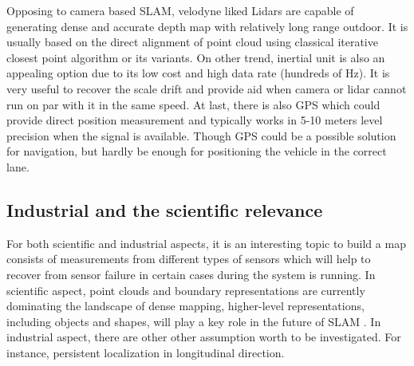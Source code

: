 Opposing to camera based \gls{SLAM}, velodyne liked Lidars are capable
of generating dense and accurate depth map with relatively long range
outdoor. It is usually based on the direct alignment of point cloud
using classical iterative closest point algorithm or its variants. On
other trend, inertial unit is also an appealing option due to its low
cost and high data rate (hundreds of Hz). It is very useful to recover
the scale drift and provide aid when camera or lidar cannot run on par
with it in the same speed. At last, there is also GPS which could
provide direct position measurement and typically works in 5-10 meters
level precision when the signal is available. Though GPS could be a
possible solution for navigation, but hardly be enough for positioning
the vehicle in the correct lane.


\subsection{Industrial and the scientific relevance}

For both scientific and industrial aspects, it is an interesting topic
to build a map consists of measurements from different types of
sensors which will help to recover from sensor failure in certain
cases during the system is running. In scientific aspect, point clouds
and boundary representations are currently dominating the landscape of
dense mapping, higher-level representations, including objects and
shapes, will play a key role in the future of \gls{SLAM} \cite{DBLP:journals/corr/CadenaCCLSN0L16}. In
industrial aspect, there are other other assumption worth to be
investigated. For instance, persistent localization in longitudinal
direction.



